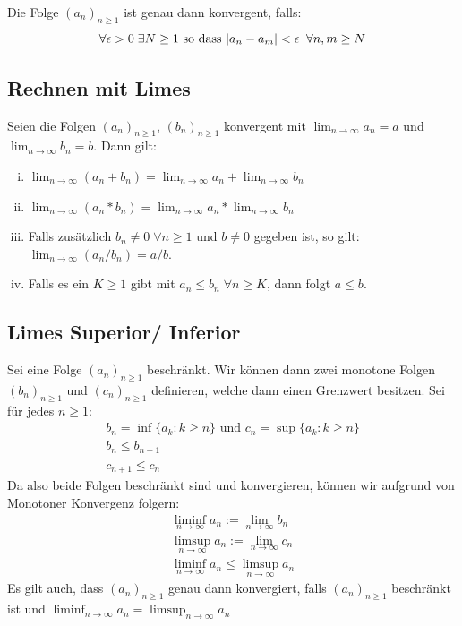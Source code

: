 \documentclass[8pt]{article}
\begin{document}
\begin{multicols*}{3}
Die Folge $(a_n)_{n \geq 1}$ ist genau dann konvergent, falls:
$$
  \forall \epsilon > 0 \; \exists N \geq 1 \text{ so dass } |a_n - a_m| < \epsilon \; \; \forall n, m \geq N\\
$$

  \subsection {Rechnen mit Limes}

Seien die Folgen $(a_n)_{n \geq 1}$, $(b_n)_{n \geq 1}$ konvergent mit
$\lim_{n \rightarrow \infty} a_n = a$ und $\lim_{n \rightarrow \infty} b_n = b$.
Dann gilt:
\begin{enumerate}[(i)]
  \item $\lim_{n \rightarrow \infty} (a_n + b_n) = \lim_{n \rightarrow \infty} a_n + \lim_{n \rightarrow \infty} b_n$
  \item $\lim_{n \rightarrow \infty} (a_n * b_n) = \lim_{n \rightarrow \infty} a_n * \lim_{n \rightarrow \infty} b_n$
  \item Falls zusätzlich $b_n \neq 0 \; \forall n \geq 1$ und $b \neq 0$ gegeben ist, so gilt: $\lim_{n \rightarrow \infty} (a_n / b_n) = a / b$.
  \item Falls es ein $K \geq 1$ gibt mit $a_n \leq b_n \; \forall n \geq K$, dann folgt $a \leq b$.
\end{enumerate}
  \subsection{Limes Superior/ Inferior}
Sei eine Folge $(a_n)_{n \geq 1}$ beschränkt. Wir können dann zwei monotone
Folgen $(b_n)_{n \geq 1}$ und $(c_n)_{n \geq 1}$ definieren, welche dann einen Grenzwert besitzen.
Sei für jedes $n \geq 1$:
\begin{gather*}
  b_n = \inf\{a_k : k \geq n\} \text{ und } c_n = \sup\{a_k : k \geq n\}\\
  b_n \leq b_{n + 1}\\
  c_{n + 1} \leq c_n
\end{gather*}
Da also beide Folgen beschränkt sind und konvergieren, können wir aufgrund von
Monotoner Konvergenz folgern:
\begin{gather*}
  \liminf_{n \rightarrow \infty} a_n := \lim_{n \rightarrow \infty} b_n\\
  \limsup_{n \rightarrow \infty} a_n := \lim_{n \rightarrow \infty} c_n\\
  \liminf_{n \rightarrow \infty} a_n \leq \limsup_{n \rightarrow \infty} a_n
\end{gather*}
Es gilt auch, dass $(a_n)_{n \geq 1}$ genau dann konvergiert, falls $(a_n)_{n \geq 1}$
beschränkt ist und $\liminf_{n \rightarrow \infty} a_n = \limsup_{n \rightarrow \infty} a_n$

\end{multicols*}
\end{document}

